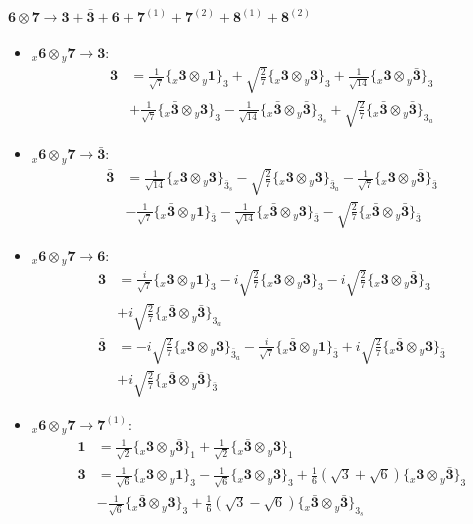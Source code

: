 \documentclass[english]{article}
\newcommand{\rep}[1]{\mathbf{#1}}
\newcommand{\repx}[2]{{}_{#2}\mathbf{#1}}
\newcommand{\tsprod}[2]{\rep{#1}\otimes\rep{#2}}
\newcommand{\tsprodx}[2]{\repx{#1}{x}\otimes\repx{#2}{y}}
\newcommand{\subcgt}[3]{\big\{ \tsprodx{#1}{#2}\big\}^{}_{#3}}
\begin{document}
\paragraph*{\Large $\tsprod{6}{7}\to\rep{3}+\rep{\bar{3}}+\rep{6}+\rep{7}^{(1)}+\rep{7}^{(2)}+\rep{8}^{(1)}+\rep{8}^{(2)}$}
\begin{itemize}
\item $\tsprodx{6}{7}\to\rep{3}$:
\begin{align*}
\rep{3} & = \frac{1}{\sqrt{7}}\subcgt{3}{1}{3}+\sqrt{\frac{2}{7}}\subcgt{3}{3}{3}+\frac{1}{\sqrt{14}}\subcgt{3}{\bar{3}}{3} \\ 
 & +\frac{1}{\sqrt{7}}\subcgt{\bar{3}}{3}{3}-\frac{1}{\sqrt{14}}\subcgt{\bar{3}}{\bar{3}}{3_{s}}+\sqrt{\frac{2}{7}}\subcgt{\bar{3}}{\bar{3}}{3_{a}}
\end{align*}
\item $\tsprodx{6}{7}\to\rep{\bar{3}}$:
\begin{align*}
\rep{\bar{3}} & = \frac{1}{\sqrt{14}}\subcgt{3}{3}{\bar{3}_{s}}-\sqrt{\frac{2}{7}}\subcgt{3}{3}{\bar{3}_{a}}-\frac{1}{\sqrt{7}}\subcgt{3}{\bar{3}}{\bar{3}} \\ 
 & -\frac{1}{\sqrt{7}}\subcgt{\bar{3}}{1}{\bar{3}}-\frac{1}{\sqrt{14}}\subcgt{\bar{3}}{3}{\bar{3}}-\sqrt{\frac{2}{7}}\subcgt{\bar{3}}{\bar{3}}{\bar{3}}
\end{align*}
\item $\tsprodx{6}{7}\to\rep{6}$:
\begin{align*}
\rep{3} & = \frac{i}{\sqrt{7}}\subcgt{3}{1}{3}-i \sqrt{\frac{2}{7}}\subcgt{3}{3}{3}-i \sqrt{\frac{2}{7}}\subcgt{3}{\bar{3}}{3} \\ 
 & +i \sqrt{\frac{2}{7}}\subcgt{\bar{3}}{\bar{3}}{3_{a}}
\\
\rep{\bar{3}} & = -i \sqrt{\frac{2}{7}}\subcgt{3}{3}{\bar{3}_{a}}-\frac{i}{\sqrt{7}}\subcgt{\bar{3}}{1}{\bar{3}}+i \sqrt{\frac{2}{7}}\subcgt{\bar{3}}{3}{\bar{3}} \\ 
 & +i \sqrt{\frac{2}{7}}\subcgt{\bar{3}}{\bar{3}}{\bar{3}}
\end{align*}
\item $\tsprodx{6}{7}\to\rep{7}^{(1)}$:
\begin{align*}
\rep{1} & = \frac{1}{\sqrt{2}}\subcgt{3}{\bar{3}}{1}+\frac{1}{\sqrt{2}}\subcgt{\bar{3}}{3}{1}
\\
\rep{3} & = \frac{1}{\sqrt{6}}\subcgt{3}{1}{3}-\frac{1}{\sqrt{6}}\subcgt{3}{3}{3}+\frac{1}{6} \left(\sqrt{3}+\sqrt{6}\right)\subcgt{3}{\bar{3}}{3} \\ 
 & -\frac{1}{\sqrt{6}}\subcgt{\bar{3}}{3}{3}+\frac{1}{6} \left(\sqrt{3}-\sqrt{6}\right)\subcgt{\bar{3}}{\bar{3}}{3_{s}}

\end{align*}
\end{itemize}
\end{document}
